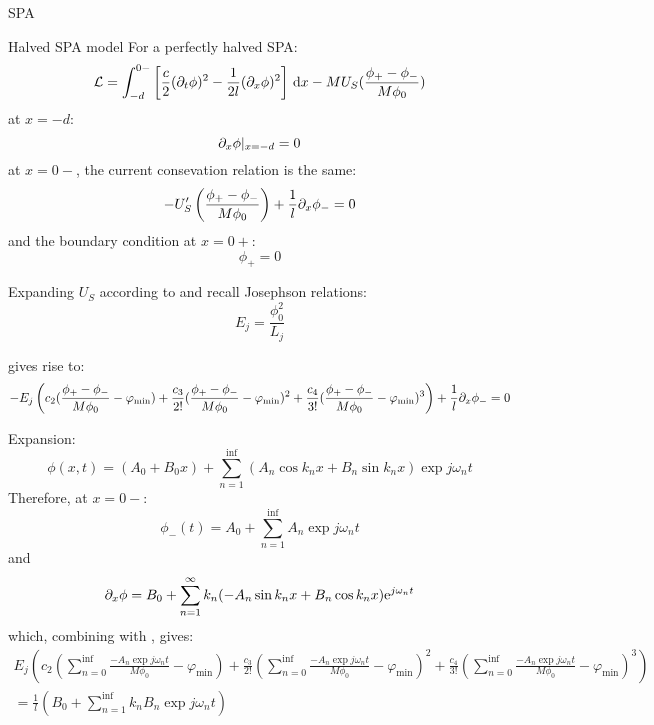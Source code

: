 \documentclass[12pt,a4paper]{article}
\begin{document}
\begin{section}{SPA}
\begin{subsection}{Halved SPA model}
For a perfectly halved SPA: 
\begin{equation}
\Lagrangian = \integral{\left[ \frac{c}{2}(\dt{\phi})^2 - \frac{1}{2l} (\dx{\phi})^2 \right]}{x}{-d}{0-} - M U_S(\frac{\phi_+ - \phi_-}{M\phi_0})
\end{equation}
at $x = -d$: 
\begin{equation}\label{eq:BC-d}
\dx \phi |_{x=-d} = 0
\end{equation}
at $x = 0-$, the current consevation relation is the same: 
\begin{equation}\label{eq:BC0-}
- U_S'\left(\frac{\phi_+ - \phi_-}{M \phi_0}\right) + \frac{1}{l}\dx\phi_- = 0
\end{equation}
and the boundary condition at $x = 0+$: 
\begin{equation}\label{eq:short}
\phi_+ = 0
\end{equation}

Expanding $U_S$ according to  and recall Josephson relations: 
\begin{equation}
E_j = \frac{\phi_0^2}{L_j}
\end{equation}


 gives rise to: 
\begin{equation}\label{eq:BC0--}
- E_j \left( c_2(\frac{\phi_+ - \phi_-}{M\phi_0} - \varphi_{\mathrm{min}}) + \frac{c_3}{2!}(\frac{\phi_+ - \phi_-}{M\phi_0} - \varphi_{\mathrm{min}})^2 +  \frac{c_4}{3!}(\frac{\phi_+ - \phi_-}{M\phi_0} - \varphi_{\mathrm{min}})^3 \right)+ \frac{1}{l}\dx \phi_- = 0
\end{equation}



Expansion: 
\begin{equation}
\phi(x,t) = (A_0 + B_0 x) + \sum_{n=1}^\inf{(A_n \cos k_n x + B_n \sin k_n x)\exp{j\omega_n t}} 
\end{equation}
Therefore, at $x = 0-$: 
\begin{equation}
\phi_-(t) = A_0 + \sum_{n=1}^\inf{A_n \exp{j\omega_n t}} 
\end{equation}
and 
\begin{equation}\label{eq:x<0}
\dx \phi  = B_0 + \sum_{n=1}^\inf{ k_n ( - A_n \sin k_n x  + B_n \cos k_n x)\exp{j\omega_n t}} 
\end{equation}
which, combining with , gives:
\begin{equation}\label{eq:0}
\begin{aligned}
E_j \left( c_2(\sum_{n=0}^\inf{\frac{- A_n \exp{j\omega_n t}}{M\phi_0}} - \varphi_{\mathrm{min}}) + \frac{c_3}{2!}(\sum_{n=0}^\inf{\frac{- A_n \exp{j\omega_n t}}{M\phi_0}} - \varphi_{\mathrm{min}})^2 +  \frac{c_4}{3!}(\sum_{n=0}^\inf{\frac{- A_n \exp{j\omega_n t}}{M\phi_0}} - \varphi_{\mathrm{min}})^3 \right) \\ 
= \frac{1}{l} \left(B_0 + \sum_{n=1}^\inf k_n B_n\exp{j\omega_n t}\right)
\end{aligned}
\end{equation}


\end{subsection}
\end{section}
\end{document}
